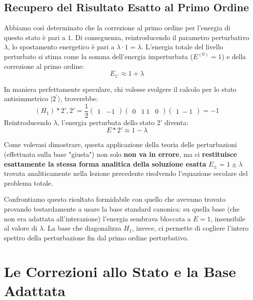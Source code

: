\subsection{Recupero del Risultato Esatto al Primo Ordine}
Abbiamo così determinato che la correzione al primo ordine per l'energia di questo stato è pari a $1$. Di conseguenza, reintroducendo il parametro perturbativo $\lambda$, lo spostamento energetico è pari a $\lambda \cdot 1 = \lambda$.
L'energia totale del livello perturbato si stima come la somma dell'energia imperturbata ($E^{(0)} = 1$) e della correzione al primo ordine:
\begin{equation}
E_{1'} \approx 1 + \lambda
\end{equation}

In maniera perfettamente speculare, chi volesse svolgere il calcolo per lo stato antisimmetrico $\vert{}2^{\prime}\rangle$, troverebbe:
\begin{equation}
(H_1)*{2',2'} = \frac{1}{2} \begin{pmatrix} 1 & -1 \end{pmatrix} \begin{pmatrix} 0 & 1 \ 1 & 0 \end{pmatrix} \begin{pmatrix} 1 \ -1 \end{pmatrix} = -1
\end{equation}
Reintroducendo $\lambda$, l'energia perturbata dello stato 2' diventa:
\begin{equation}
E*{2'} \approx 1 - \lambda
\end{equation}

Come volevasi dimostrare, questa applicazione della teoria delle perturbazioni (effettuata sulla base "giusta") non solo \textbf{non va in errore}, ma ci \textbf{restituisce esattamente la stessa forma analitica della soluzione esatta} $E_{\pm} = 1 \pm \lambda$ trovata analiticamente nella lezione precedente risolvendo l'equazione secolare del problema totale.

Confrontiamo questo risultato formidabile con quello che avevamo trovato provando testardamente a usare la base standard canonica: su quella base (che non era adattata all'interazione) l'energia sembrava bloccata a $E=1$, insensibile al valore di $\lambda$. La base che diagonalizza $H_1$, invece, ci permette di cogliere l'intero spettro della perturbazione fin dal primo ordine perturbativo.

\section{Le Correzioni allo Stato e la Base Adattata}

